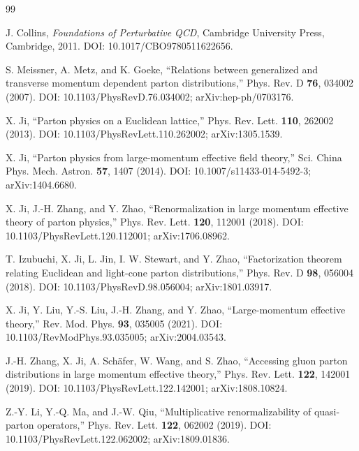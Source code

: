 \documentclass[UTF8,12pt,a4paper,twoside,openany]{ctexbook}
\begin{document}
\backmatter
\begin{thebibliography}{99}

J. Collins,
\newblock \textit{Foundations of Perturbative QCD},
\newblock Cambridge University Press, Cambridge, 2011.
\newblock DOI: 10.1017/CBO9780511622656.

S. Meissner, A. Metz, and K. Goeke,
\newblock ``Relations between generalized and transverse momentum dependent parton distributions,''
\newblock Phys. Rev. D \textbf{76}, 034002 (2007).
\newblock DOI: 10.1103/PhysRevD.76.034002; arXiv:hep-ph/0703176.

X. Ji,
\newblock ``Parton physics on a Euclidean lattice,''
\newblock Phys. Rev. Lett. \textbf{110}, 262002 (2013).
\newblock DOI: 10.1103/PhysRevLett.110.262002; arXiv:1305.1539.

X. Ji,
\newblock ``Parton physics from large-momentum effective field theory,''
\newblock Sci. China Phys. Mech. Astron. \textbf{57}, 1407 (2014).
\newblock DOI: 10.1007/s11433-014-5492-3; arXiv:1404.6680.

X. Ji, J.-H. Zhang, and Y. Zhao,
\newblock ``Renormalization in large momentum effective theory of parton physics,''
\newblock Phys. Rev. Lett. \textbf{120}, 112001 (2018).
\newblock DOI: 10.1103/PhysRevLett.120.112001; arXiv:1706.08962.

T. Izubuchi, X. Ji, L. Jin, I. W. Stewart, and Y. Zhao,
\newblock ``Factorization theorem relating Euclidean and light-cone parton distributions,''
\newblock Phys. Rev. D \textbf{98}, 056004 (2018).
\newblock DOI: 10.1103/PhysRevD.98.056004; arXiv:1801.03917.

X. Ji, Y. Liu, Y.-S. Liu, J.-H. Zhang, and Y. Zhao,
\newblock ``Large-momentum effective theory,''
\newblock Rev. Mod. Phys. \textbf{93}, 035005 (2021).
\newblock DOI: 10.1103/RevModPhys.93.035005; arXiv:2004.03543.

J.-H. Zhang, X. Ji, A. Schäfer, W. Wang, and S. Zhao,
\newblock ``Accessing gluon parton distributions in large momentum effective theory,''
\newblock Phys. Rev. Lett. \textbf{122}, 142001 (2019).
\newblock DOI: 10.1103/PhysRevLett.122.142001; arXiv:1808.10824.

Z.-Y. Li, Y.-Q. Ma, and J.-W. Qiu,
\newblock ``Multiplicative renormalizability of quasi-parton operators,''
\newblock Phys. Rev. Lett. \textbf{122}, 062002 (2019).
\newblock DOI: 10.1103/PhysRevLett.122.062002; arXiv:1809.01836.


\end{thebibliography}
\end{document}

